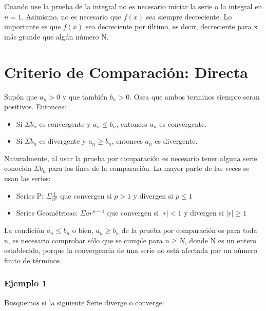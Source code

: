 \documentclass[12pt]{report}                                %
\begin{document}
        Cuando use la prueba de la integral no es necesario iniciar la serie o la integral en $n=1$.
        Asimismo, no es necesario que $f(x)$ sea siempre decreciente.
        Lo importante es que $f(x)$ sea decreciente por último, es decir, decreciente para x más
        grande que algún número N. 



    \clearpage
    \section{Criterio de Comparación: Directa}

        Supón que $a _n > 0$ y que también $b_n > 0$. Osea que ambos terminos siempre seran positivos.
        Entonces:

        \begin{itemize}
            \item Si $\Sigma b_n$ es convergente y $a_n \leq b_n$, entonces $a_n$ es convergente. 
            \item Si $\Sigma b_n$ es divergente y $a_n \geq b_n$, entonces $a_n$ es divergente. 
        \end{itemize}

        Naturalmente, al usar la prueba por comparación es necesario tener alguna serie conocida $\Sigma b_n$
        para los fines de la comparación. La mayor parte de las veces se usan las series:

        \begin{itemize}
            \item Series P: $\Sigma \frac{1}{n^p}$ que convergen si $p>1$ y divergen si $p\leq 1$
            \item Series Geométricas: $\Sigma ar^{n-1}$ que convergen si $|r|<1$ y divergen si $|r|\geq 1$
        \end{itemize}

        La condición $a_n \leq b_n$ o bien, $a_n \geq b_n$ de la prueba por comparación es para toda n, es
        necesario comprobar sólo que se cumple para $n \geq N$, donde N es un entero establecido, porque
        la convergencia de una serie no está afectada por un número finito de términos.

            \subsubsection{Ejemplo 1}
            Busquemos si la siguiente Serie diverge o converge:
\end{document}
